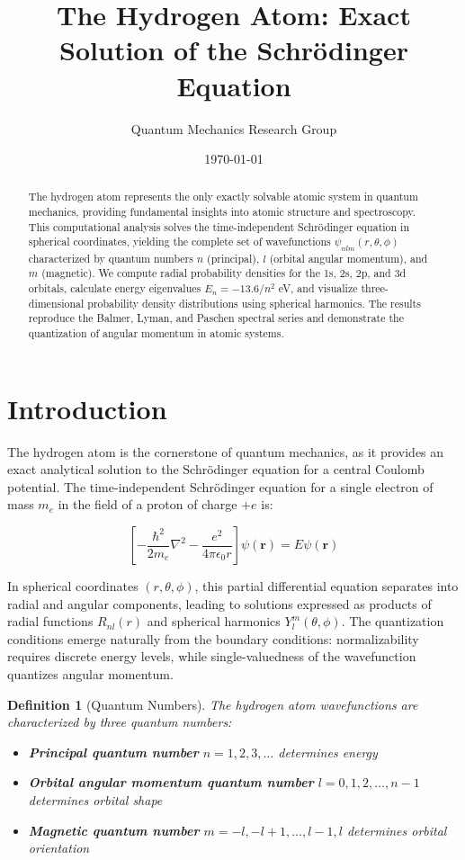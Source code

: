 \documentclass[11pt,a4paper]{article}
\title{The Hydrogen Atom: Exact Solution of the Schrödinger Equation}
\author{Quantum Mechanics Research Group}
\date{\today}
\newtheorem{definition}{Definition}[section]
\begin{document}
\maketitle

\begin{abstract}
The hydrogen atom represents the only exactly solvable atomic system in quantum mechanics, providing fundamental insights into atomic structure and spectroscopy. This computational analysis solves the time-independent Schrödinger equation in spherical coordinates, yielding the complete set of wavefunctions $\psi_{nlm}(r,\theta,\phi)$ characterized by quantum numbers $n$ (principal), $l$ (orbital angular momentum), and $m$ (magnetic). We compute radial probability densities for the 1s, 2s, 2p, and 3d orbitals, calculate energy eigenvalues $E_n = -13.6/n^2$ eV, and visualize three-dimensional probability density distributions using spherical harmonics. The results reproduce the Balmer, Lyman, and Paschen spectral series and demonstrate the quantization of angular momentum in atomic systems.
\end{abstract}

\section{Introduction}

The hydrogen atom is the cornerstone of quantum mechanics, as it provides an exact analytical solution to the Schrödinger equation for a central Coulomb potential. The time-independent Schrödinger equation for a single electron of mass $m_e$ in the field of a proton of charge $+e$ is:

\begin{equation}
\left[-\frac{\hbar^2}{2m_e}\nabla^2 - \frac{e^2}{4\pi\epsilon_0 r}\right]\psi(\mathbf{r}) = E\psi(\mathbf{r})
\end{equation}

In spherical coordinates $(r,\theta,\phi)$, this partial differential equation separates into radial and angular components, leading to solutions expressed as products of radial functions $R_{nl}(r)$ and spherical harmonics $Y_l^m(\theta,\phi)$. The quantization conditions emerge naturally from the boundary conditions: normalizability requires discrete energy levels, while single-valuedness of the wavefunction quantizes angular momentum.

\begin{definition}[Quantum Numbers]
The hydrogen atom wavefunctions are characterized by three quantum numbers:
\begin{itemize}
\item \textbf{Principal quantum number} $n = 1, 2, 3, \ldots$ determines energy
\item \textbf{Orbital angular momentum quantum number} $l = 0, 1, 2, \ldots, n-1$ determines orbital shape
\item \textbf{Magnetic quantum number} $m = -l, -l+1, \ldots, l-1, l$ determines orbital orientation
\end{itemize}
\end{definition}
\end{document}
